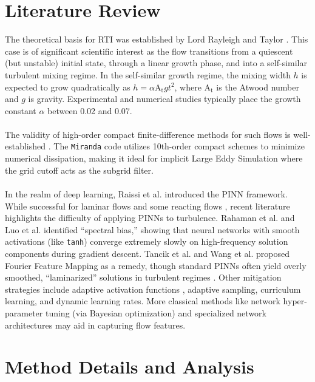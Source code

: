 \documentclass{homework}
\begin{document}
\section{Literature Review}
The theoretical basis for RTI was established by Lord Rayleigh \cite{Rayleigh1883} and Taylor \cite{Taylor1950,Lewis1950}. This case is of significant scientific interest \cite{Dimonte2004} as the flow transitions from a quiescent (but unstable) initial state, through a linear growth phase, and into a self-similar turbulent mixing regime. In the self-similar growth regime, the mixing width $h$ is expected to grow quadratically as $h = \alpha \mathrm{A_t} g t^2$, where $\mathrm{A_t}$ is the Atwood number and $g$ is gravity. Experimental and numerical studies \cite{Dimonte2004,Zhou2017_1,Zhou2017_2,Zhou2021} typically place the growth constant $\alpha$ between 0.02 and 0.07.
\\ \\
The validity of high-order compact finite-difference methods for such flows is well-established \cite{Cabot2006,Olson2013}. The \texttt{Miranda} \cite{Cook2007, Lele1992} code utilizes 10th-order compact schemes to minimize numerical dissipation, making it ideal for implicit Large Eddy Simulation where the grid cutoff acts as the subgrid filter.
\\ \\
In the realm of deep learning, Raissi et al. \cite{Raissi2017_1,Raissi2017_2,Raissi2019} introduced the PINN framework. While successful for laminar flows and some reacting flows \cite{Yadav2025}, recent literature highlights the difficulty of applying PINNs to turbulence. Rahaman et al. \cite{Rahaman2019} and Luo et al. \cite{LUO2021} identified ``spectral bias,'' showing that neural networks with smooth activations (like \texttt{tanh}) converge extremely slowly on high-frequency solution components during gradient descent. Tancik et al. \cite{Tancik2020} and Wang et al. \cite{WANG2021} proposed Fourier Feature Mapping as a remedy, though standard PINNs often yield overly smoothed, ``laminarized'' solutions in turbulent regimes \cite{Yadav2025}. Other mitigation strategies include adaptive activation functions \cite{JAGTAP2020}, adaptive sampling, curriculum learning, and dynamic learning rates. More classical methods like network hyper-parameter tuning (via Bayesian optimization) and specialized network architectures may aid in capturing flow features.

\section{Method Details and Analysis}
\end{document}
